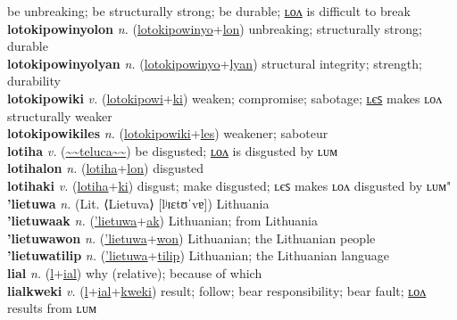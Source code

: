be unbreaking; be structurally strong; be durable; \hyperref[lotokipowinyolon]{ʟᴏᴧ} is difficult to break \label{lotokipowinyo} \\
\textbf{lotokipowinyolon} \textit{n.} (\hyperref[lotokipowinyo]{lotokipowinyo}+\hyperref[lon]{lon})
unbreaking; structurally strong; durable \label{lotokipowinyolon} \\
\textbf{lotokipowinyolyan} \textit{n.} (\hyperref[lotokipowinyo]{lotokipowinyo}+\hyperref[lyan]{lyan})
structural integrity; strength; durability \label{lotokipowinyolyan} \\
\textbf{lotokipowiki} \textit{v.} (\hyperref[lotokipowi]{lotokipowi}+\hyperref[ki]{ki})
weaken; compromise; sabotage; \hyperref[lotokipowikiles]{ʟєꜱ} makes ʟᴏᴧ structurally weaker \label{lotokipowiki} \\
\textbf{lotokipowikiles} \textit{n.} (\hyperref[lotokipowiki]{lotokipowiki}+\hyperref[les]{les})
weakener; saboteur \label{lotokipowikiles} \\
\textbf{lotiha} \textit{v.} (\hyperref[teluca]{\~{}\~{}teluca\~{}\~{}})
be disgusted; \hyperref[lotihalon]{ʟᴏᴧ} is disgusted by ʟᴜᴍ \label{lotiha} \\
\textbf{lotihalon} \textit{n.} (\hyperref[lotiha]{lotiha}+\hyperref[lon]{lon})
disgusted \label{lotihalon} \\
\textbf{lotihaki} \textit{v.} (\hyperref[lotiha]{lotiha}+\hyperref[ki]{ki})
disgust; make disgusted; ʟєꜱ makes ʟᴏᴧ disgusted by ʟᴜᴍ" \label{lotihaki} \\
\textbf{'lietuwa} \textit{n.} (Lit. ⟨Lietuva⟩ [lʲɪɛtʊˈvɐ])
Lithuania \label{'lietuwa} \\
\textbf{'lietuwaak} \textit{n.} (\hyperref['lietuwa]{'lietuwa}+\hyperref[ak]{ak})
Lithuanian; from Lithuania \label{'lietuwaak} \\
\textbf{'lietuwawon} \textit{n.} (\hyperref['lietuwa]{'lietuwa}+\hyperref[won]{won})
Lithuanian; the Lithuanian people \label{'lietuwawon} \\
\textbf{'lietuwatilip} \textit{n.} (\hyperref['lietuwa]{'lietuwa}+\hyperref[tilip]{tilip})
Lithuanian; the Lithuanian language \label{'lietuwatilip} \\
\textbf{lial} \textit{n.} (\hyperref[l]{l}+\hyperref[al]{ial})
why (relative); because of which \label{lial} \\
\textbf{lialkweki} \textit{v.} (\hyperref[l]{l}+\hyperref[ial]{ial}+\hyperref[kweki]{kweki})
result; follow; bear responsibility; bear fault; \hyperref[lialkwekilon]{ʟᴏᴧ} results from ʟᴜᴍ \label{lialkweki} \\
